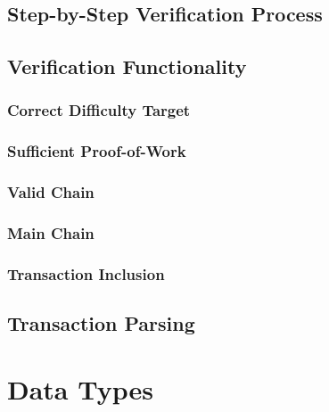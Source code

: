\documentclass[letterpaper,10pt,english]{sphinxmanual}
\begin{document}
\section{Step-by-Step Verification Process}
\label{\detokenize{verification-methods:step-by-step-verification-process}}

\section{Verification Functionality}
\label{\detokenize{verification-methods:verification-functionality}}

\subsection{Correct Difficulty Target}
\label{\detokenize{verification-methods:correct-difficulty-target}}

\subsection{Sufficient Proof-of-Work}
\label{\detokenize{verification-methods:sufficient-proof-of-work}}

\subsection{Valid Chain}
\label{\detokenize{verification-methods:valid-chain}}

\subsection{Main Chain}
\label{\detokenize{verification-methods:main-chain}}

\subsection{Transaction Inclusion}
\label{\detokenize{verification-methods:transaction-inclusion}}

\section{Transaction Parsing}
\label{\detokenize{verification-methods:transaction-parsing}}

\chapter{Data Types}
\label{\detokenize{data-types:data-types}}\label{\detokenize{data-types::doc}}
\end{document}
